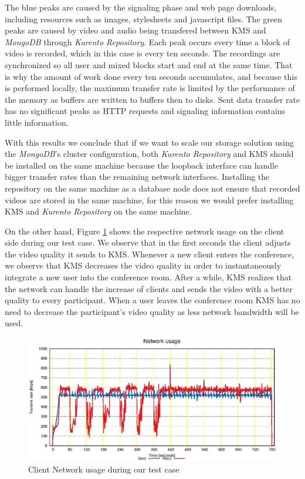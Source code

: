 \documentclass[10pt,conference]{IEEEtran}
\begin{document}
      The blue peaks are caused by the signaling phase and web page downloads, including resources such as images, stylesheets and javascript files. 
      The green peaks are caused by video and audio being transfered between \gls{KMS} and \emph{MongoDB} through \emph{Kurento Repository}. Each peak occurs every time a block of video is recorded, which in this case is every ten seconds. 
      The recordings are synchronized so all user and mixed blocks start and end at the same time. That is why the amount of work done every ten seconds accumulates, and because this is performed locally, the maximum transfer rate is limited by the performance of the memory as buffers are written to buffers then to disks. 
      Sent data transfer rate has no significant peaks as \gls{HTTP} requests and signaling information contains little information.

	With this results we conclude that if we want to scale our storage solution using the \emph{MongoDB}'s cluster configuration, both \emph{Kurento Repository} and \gls{KMS} should be installed on the same machine because the loopback interface can handle bigger transfer rates than the remaining network interfaces. Installing the repository on the same machine as a database node does not ensure that recorded videos are stored in the same machine, for this reason we would prefer installing \gls{KMS} and \emph{Kurento Repository} on the same machine.





On the other hand, Figure \ref{fig:test_client_net} shows the respective network usage on the client side during our test case. We observe that in the first seconds the client adjusts the video quality it sends to \gls{KMS}. Whenever a new client enters the conference, we observe that \gls{KMS} decreases the video quality in order to instantaneously integrate a new user into the conference room. After a while, \gls{KMS} realizes that the network can handle the increase of clients and sends the video with a better quality to every participant. When a user leaves the conference room \gls{KMS} has no need to decrease the participant's video quality as less network bandwidth will be used.

\begin{figure}
  \centering
  \includegraphics[width=\linewidth]{stats/test_client_net.eps}
  \caption{Client Network usage during our test case}
  \label{fig:test_client_net}
\end{figure}
\end{document}
